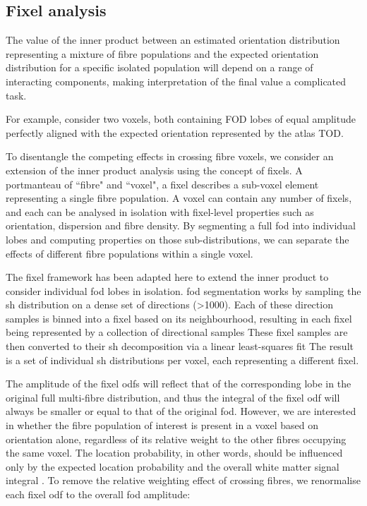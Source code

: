 \subsection{Fixel analysis}\label{sec:fixel}

The value of the inner product between an estimated orientation distribution representing a mixture of fibre populations and the expected orientation distribution for a specific isolated population will depend on a range of interacting components, making interpretation of the final value a complicated task.


For example, consider two voxels, both containing FOD lobes of equal amplitude perfectly aligned with the expected orientation represented by the atlas TOD.

To disentangle the competing effects in crossing fibre voxels, we consider an extension of the inner product analysis using the concept of fixels.
A portmanteau of ``fibre" and ``voxel", a fixel describes a sub-voxel element representing a single fibre population.
A voxel can contain any number of fixels, and each can be analysed in isolation with fixel-level properties such as orientation, dispersion and fibre density.
By segmenting a full \gls{fod} into individual lobes and computing properties on those sub-distributions, we can separate the effects of different fibre populations within a single voxel.

The fixel framework has been adapted here to extend the inner product to consider individual \gls{fod} lobes in isolation.
\gls{fod} segmentation works by sampling the \gls{sh} distribution on a dense set of directions (>1000).
Each of these direction samples is binned into a fixel based on its neighbourhood, resulting in each fixel being represented by a collection of directional samples 
These fixel samples are then converted to their \gls{sh} decomposition via a linear least-squares fit 
The result is a set of individual \gls{sh} distributions per voxel, each representing a different fixel.

The amplitude of the fixel \glspl{odf} will reflect that of the corresponding lobe in the original full multi-fibre distribution, and thus the integral of the fixel \gls{odf} will always be smaller or equal to that of the original \gls{fod}.
However, we are interested in whether the fibre population of interest is present in a voxel based on orientation alone, regardless of its relative weight to the other fibres occupying the same voxel.
The location probability, in other words, should be influenced only by the expected location probability  and the overall white matter signal integral .
To remove the relative weighting effect of crossing fibres, we renormalise each fixel \gls{odf} to the overall \gls{fod} amplitude:

